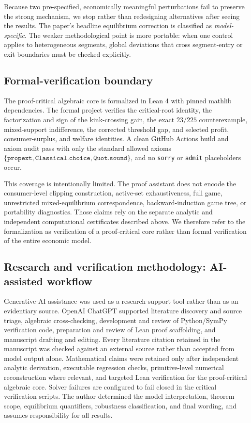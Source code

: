 Because two pre-specified, economically meaningful perturbations fail to preserve the strong mechanism, we stop rather than redesigning alternatives after seeing the results.  The paper's headline equilibrium correction is classified as \emph{model-specific}.  The weaker methodological point is more portable: when one control applies to heterogeneous segments, global deviations that cross segment-entry or exit boundaries must be checked explicitly.

\subsection{Formal-verification boundary}

The proof-critical algebraic core is formalized in Lean 4 with pinned mathlib dependencies.  The formal project verifies the critical-root identity, the factorization and sign of the kink-crossing gain, the exact \(23/225\) counterexample, mixed-support indifference, the corrected threshold gap, and selected profit, consumer-surplus, and welfare identities.  A clean GitHub Actions build and axiom audit pass with only the standard allowed axioms \(\{\texttt{propext},\texttt{Classical.choice},\texttt{Quot.sound}\}\), and no \texttt{sorry} or \texttt{admit} placeholders occur.

This coverage is intentionally limited.  The proof assistant does not encode the consumer-level clipping construction, active-set exhaustiveness, full game, unrestricted mixed-equilibrium correspondence, backward-induction game tree, or portability diagnostics.  Those claims rely on the separate analytic and independent computational certificates described above.  We therefore refer to the formalization as verification of a proof-critical core rather than formal verification of the entire economic model.


\subsection{Research and verification methodology: AI-assisted workflow}

Generative-AI assistance was used as a research-support tool rather than as an evidentiary source.  OpenAI ChatGPT supported literature discovery and source triage, algebraic cross-checking, development and review of Python/SymPy verification code, preparation and review of Lean proof scaffolding, and manuscript drafting and editing.  Every literature citation retained in the manuscript was checked against an external source rather than accepted from model output alone.  Mathematical claims were retained only after independent analytic derivation, executable regression checks, primitive-level numerical reconstruction where relevant, and targeted Lean verification for the proof-critical algebraic core.  Solver failures are configured to fail closed in the critical verification scripts.  The author determined the model interpretation, theorem scope, equilibrium quantifiers, robustness classification, and final wording, and assumes responsibility for all results.

